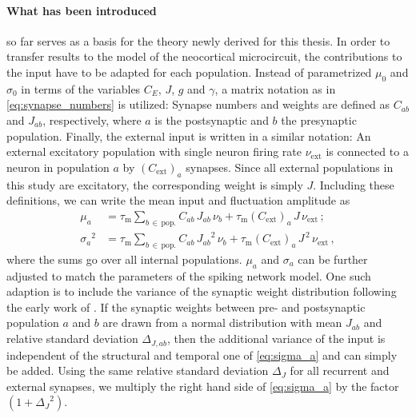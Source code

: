 \paragraph{What has been introduced}so far serves as a basis for the theory newly derived for this
thesis. In order to transfer results to the model of the neocortical microcircuit, 
the contributions to the input have to be adapted for each population. 
Instead of 
parametrized $\mu_0$ and $\sigma_0$ in terms of the variables $C_E$, $J$, $g$ and $\gamma$, 
a matrix notation as in \autoref{eq:synapse_numbers} is utilized: 
Synapse numbers and weights are defined as $C_{ab}$ and $J_{ab}$, respectively, 
where $a$ is the postsynaptic and $b$ the presynaptic population. 
Finally, the external input is written in a similar notation: 
An external excitatory population with single neuron firing rate $\nu_\text{ext}$ 
is connected to a neuron in population $a$ by 
$(C_\text{ext})_a$ synapses. Since all external populations in this study are 
excitatory, the corresponding weight is simply $J$.
Including these definitions, we can write the mean input and fluctuation amplitude
as
\begin{align}
    \label{eq:mu_a}
    \mu_a        &= 
        \tau_\text{m} \sum_{b \,\in \,\text{pop.}} C_{ab} \, J_{ab} \, \nu_b 
        + \tau_\text{m} (C_\text{ext})_a \, J \, \nu_\text{ext} \, ; \\
    \label{eq:sigma_a}
    {\sigma_a}^2 &= 
        \tau_\text{m} \sum_{b \,\in \,\text{pop.}} C_{ab} \, {J_{ab}}^2  \, \nu_b
        + \tau_\text{m} (C_\text{ext})_a \,J^{\,2} \,\nu_\text{ext}\,,
\end{align}
where the sums go over all internal populations. 
$\mu_a$ and $\sigma_a$ can be further adjusted to match the parameters of the spiking network 
model. One such adaption is to include the variance of the synaptic weight distribution 
following the early work of . 
If the synaptic weights between pre- and postsynaptic population $a$ and $b$ are drawn
from a normal distribution with mean $J_{ab}$ and relative standard deviation $\Delta_{J, ab}$, 
then the additional variance of the input is independent of the structural and temporal one
of \autoref{eq:sigma_a} and can simply be added. Using the same relative standard deviation 
$\Delta_J$ for all recurrent and external synapses, we multiply the right 
hand side of \autoref{eq:sigma_a} by the factor $(1 + {\Delta_J}^2)$.

